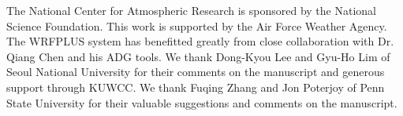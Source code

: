 \documentclass[12pt]{article}
\begin{document}

\begin{acknowledgment}
The National Center for Atmospheric Research is sponsored by the National
Science Foundation.  This work is supported by the Air Force Weather Agency. The WRFPLUS system has benefitted greatly from close collaboration with Dr. Qiang Chen and his ADG tools. We thank Dong-Kyou Lee and Gyu-Ho Lim of Seoul National University for their comments on the manuscript and generous support through KUWCC. We thank Fuqing Zhang and Jon Poterjoy of Penn State University for their valuable suggestions and comments on the manuscript.
\end{acknowledgment}


{}
{\clearpage}

%

\end{document}
